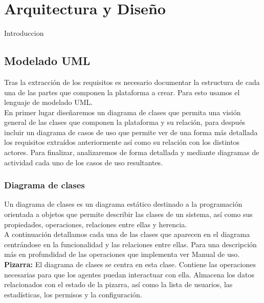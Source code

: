 \chapter{Arquitectura y Diseño}

Introduccion


\section{Modelado UML}
Tras la extracción de los requisitos es necesario documentar la estructura de cada una de las partes que componen la plataforma a crear. Para esto usamos el lenguaje de modelado UML.\\

En primer lugar diseñaremos un diagrama de clases que permita una visión general de las clases que componen la plataforma y su relación, para después incluir un diagrama de casos de uso que permite ver de una forma más detallada los requisitos extraídos anteriormente así como su relación con los distintos actores. Para finalizar, analizaremos de forma detallada y mediante diagramas de actividad cada uno de los casos de uso resultantes.\\


\subsection{Diagrama de clases}
Un diagrama de clases es un diagrama estático destinado a la programación orientada a objetos que permite describir las clases de un sistema, así como sus propiedades, operaciones, relaciones entre ellas y herencia.\\

A continuación detallamos cada una de las clases que aparecen en el diagrama centrándose en la funcionalidad y las relaciones entre ellas. Para una descripción más en profundidad de las operaciones que implementa ver Manual de uso.\\

\textbf{Pizarra:} El diagrama de clases se centra en esta clase. Contiene las operaciones necesarias para que los agentes puedan interactuar con ella. Almacena los datos relacionados con el estado de la pizarra, así como la lista de usuarios, las estadísticas, los permisos y la configuración.\\

